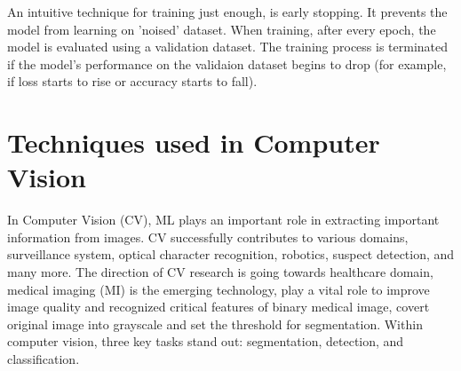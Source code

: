 \begin{figure}[htp]
\end{figure}

An intuitive technique for training just enough, is early stopping. It prevents the model from learning on 'noised' dataset. When training, after every epoch, the model is evaluated using a validation dataset. The training process is terminated if the model's performance on the validaion dataset begins to drop (for example, if loss starts to rise or accuracy starts to fall).






\section{Techniques used in Computer Vision }

In Computer Vision (CV), ML plays an important role in extracting important information from images. CV successfully contributes to various domains, surveillance system, optical character recognition, robotics, suspect detection, and many more.  The direction of CV research is going towards healthcare domain, medical imaging (MI) is the emerging technology, play a vital role to improve image quality and recognized critical features of binary medical image, covert original image into grayscale and set the threshold for segmentation.
Within computer vision, three key tasks stand out: segmentation, detection, and classification. 
